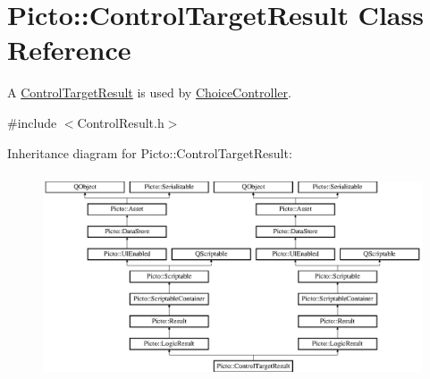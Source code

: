\hypertarget{class_picto_1_1_control_target_result}{\section{Picto\-:\-:Control\-Target\-Result Class Reference}
\label{class_picto_1_1_control_target_result}
}


A \hyperlink{class_picto_1_1_control_target_result}{Control\-Target\-Result} is used by \hyperlink{class_picto_1_1_choice_controller}{Choice\-Controller}.  




{\ttfamily \#include $<$Control\-Result.\-h$>$}

Inheritance diagram for Picto\-:\-:Control\-Target\-Result\-:\begin{figure}[H]
\begin{center}
\leavevmode
\includegraphics[height=6.072289cm]{class_picto_1_1_control_target_result}
\end{center}
\end{figure}
